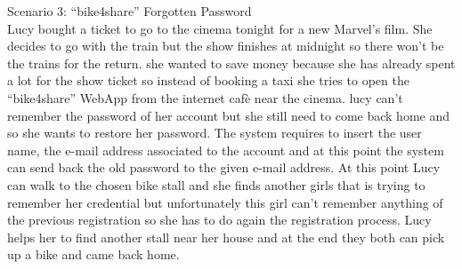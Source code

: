 \documentclass{article}
\begin{document}
Scenario 3: “bike4share” Forgotten Password \\
Lucy bought a ticket to go to the cinema tonight for a new Marvel’s film. She decides to go with the train but the show finishes at midnight so there won’t be the trains for the return. 
she wanted to save money because she has already spent a lot for the show ticket so instead of booking a taxi she tries to open the “bike4share” WebApp from the internet cafè near the cinema. lucy can’t remember the password of her account but she still need to come back home and so she wants to restore her password. 
The system requires to insert the user name, the e-mail address associated to the account and at this point the system can send back the old password to the given e-mail address.
 At this point Lucy can walk to the chosen bike stall  and she finds another girls that is trying to remember her credential but unfortunately this girl can’t remember anything of the previous registration so she has to do again the registration process. Lucy helps her to find another stall near her house and at the end they both can pick up a bike and came back home.
\end{document}
